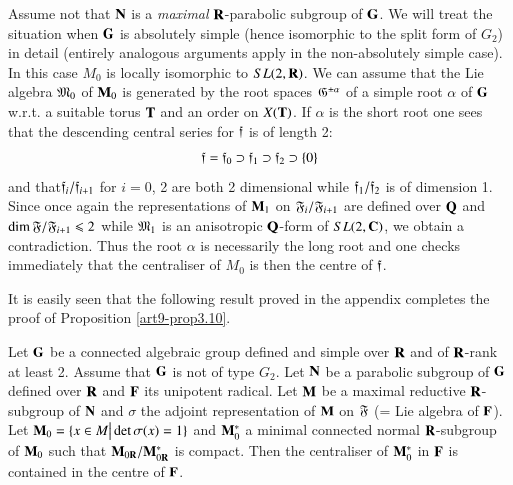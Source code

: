 Assume not that $\mathbf{N}$ is a \textit{maximal} $\mathbf{R}$-parabolic subgroup of $\mathbf{G}$. We will treat the situation when $\mathbf{G}$ is absolutely simple (hence isomorphic to the split form of $G_2$) in detail (entirely analogous arguments apply in the non-absolutely simple case). In this case $M_0$ is locally isomorphic to $SL(2, \mathbf{R})$. We can assume that the Lie algebra $\mathfrak{M}_0$ of $\mathbf{M}_0$ is generated by the root spaces $\mathfrak{G}^{ \pm \alpha}$ of a simple root $\alpha$ of $\mathbf{G}$ w.r.t. a suitable torus $\mathbf{T}$ and an order on $X (\mathbf{T})$. If $\alpha$ is the short root one sees that the descending central series for $\mathfrak{f}$ is of length 2:
$$
\mathfrak{f} = \mathfrak{f}_0 \supset \mathfrak{f}_1 \supset \mathfrak{f}_2 \supset \{0\}
$$
and that\pageoriginale $\mathfrak{f}_i / \mathfrak{f}_{i+1}$ for $i = 0$, 2 are both 2 dimensional while $\mathfrak{f}_1 / \mathfrak{f}_2$ is of dimension 1. Since once again the representations of $\mathbf{M}_1$ on $\mathfrak{F}_i/\mathfrak{F}_{i+1}$ are defined over $\mathbf{Q}$ and $\dim \mathfrak{F}/\mathfrak{F}_{i+1} \leqslant 2$ while $\mathfrak{M}_1$ is an anisotropic  $\mathbf{Q}$-form of $SL (2, \mathbf{C})$, we obtain a contradiction. Thus the root $\alpha$ is necessarily the long root and one checks immediately that the centraliser of $M_0$ is then the centre of $\mathfrak{f}$.

It is easily seen that the following result proved in the appendix completes the proof of Proposition \ref{art9-prop3.10}.

\setcounter{definition}{12}
\begin{proposition}\label{art9-prop3.13}
Let $\mathbf{G}$ be a connected algebraic group defined and simple over $\mathbf{R}$ and of $\mathbf{R}$-rank at least 2. Assume that $\mathbf{G}$ is not of type $G_2$. Let $\mathbf{N}$ be a parabolic subgroup of $\mathbf{G}$ defined over $\mathbf{R}$ and $\mathbf{F}$ its unipotent radical. Let $\mathbf{M}$ be a maximal reductive $\mathbf{R}$-subgroup of $\mathbf{N}$ and $\sigma$ the adjoint representation of $\mathbf{M}$ on $\mathfrak{F}$ (= Lie algebra of $\mathbf{F}$). Let $\mathbf{M}_0= \{x \in M \big| \det \sigma (x) = 1\}$ and $\mathbf{M}^\ast_0$ a minimal connected normal $\mathbf{R}$-subgroup of $\mathbf{M}_0$ such that $\mathbf{M}_{0\mathbf{R}} / \mathbf{M}^{\ast}_{0\mathbf{R}}$ is compact. Then the centraliser of $\mathbf{M}^\ast_0$ in $\mathbf{F}$ is contained in the centre of $\mathbf{F}$.
\end{proposition}

\setcounter{subsection}{13}
